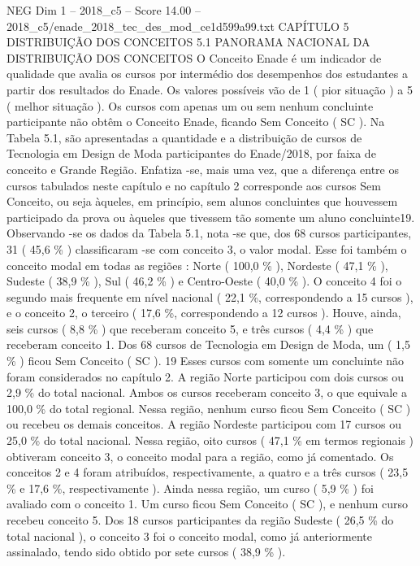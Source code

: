 \begin{textsample}{NEG Dim 1 – 2018\_c5 – Score 14.00 – 2018\_c5/enade\_2018\_tec\_des\_mod\_ce1d599a99.txt}  \label{ex:f1_neg_376}
CAPÍTULO 5 DISTRIBUIÇÃO DOS CONCEITOS 5.1 PANORAMA NACIONAL DA DISTRIBUIÇÃO DOS CONCEITOS O Conceito Enade é um indicador de qualidade que avalia os cursos por intermédio dos desempenhos dos estudantes a partir dos resultados do Enade.
Os valores possíveis vão de 1 ( pior situação ) a 5 ( melhor situação ).
Os cursos com apenas um ou sem nenhum concluinte participante não obtêm o Conceito Enade, ficando Sem Conceito ( SC ).
Na Tabela 5.1, são apresentadas a quantidade e a distribuição de cursos de Tecnologia em Design de Moda participantes do Enade/2018, por faixa de conceito e Grande Região.
Enfatiza -se, mais uma vez, que a diferença entre os cursos tabulados neste capítulo e no capítulo 2 corresponde aos cursos Sem Conceito, ou seja àqueles, em princípio, sem alunos concluintes que houvessem participado da prova ou àqueles que tivessem tão somente um aluno concluinte19.
Observando -se os dados da Tabela 5.1, nota -se que, dos 68 cursos participantes, 31 ( 45,6 \% ) classificaram -se com conceito 3, o valor modal.
Esse foi também o conceito modal em todas as regiões : Norte ( 100,0 \% ), Nordeste ( 47,1 \% ), Sudeste ( 38,9 \% ), Sul ( 46,2 \% ) e Centro-Oeste ( 40,0 \% ).
O conceito 4 foi o segundo mais frequente em nível nacional ( 22,1 \%, correspondendo a 15 cursos ), e o conceito 2, o terceiro ( 17,6 \%, correspondendo a 12 cursos ).
Houve, ainda, seis cursos ( 8,8 \% ) que receberam conceito 5, e três cursos ( 4,4 \% ) que receberam conceito 1.
Dos 68 cursos de Tecnologia em Design de Moda, um ( 1,5 \% ) ficou Sem Conceito ( SC ). 19 Esses cursos com somente um concluinte não foram considerados no capítulo 2.
A região Norte participou com dois cursos ou 2,9 \% do total nacional.
Ambos os cursos receberam conceito 3, o que equivale a 100,0 \% do total regional.
Nessa região, nenhum curso ficou Sem Conceito ( SC ) ou recebeu os demais conceitos.
A região Nordeste participou com 17 cursos ou 25,0 \% do total nacional.
Nessa região, oito cursos ( 47,1 \% em termos regionais ) obtiveram conceito 3, o conceito modal para a região, como já comentado.
Os conceitos 2 e 4 foram atribuídos, respectivamente, a quatro e a três cursos ( 23,5 \% e 17,6 \%, respectivamente ).
Ainda nessa região, um curso ( 5,9 \% ) foi avaliado com o conceito 1.
Um curso ficou Sem Conceito ( SC ), e nenhum curso recebeu conceito 5.
Dos 18 cursos participantes da região Sudeste ( 26,5 \% do total nacional ), o conceito 3 foi o conceito modal, como já anteriormente assinalado, tendo sido obtido por sete cursos ( 38,9 \% ).

\end{textsample}
